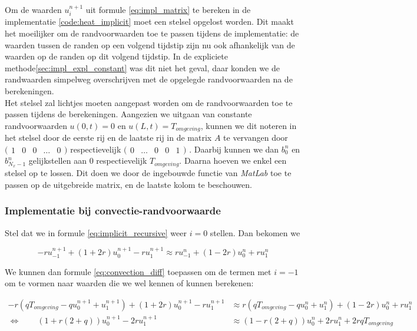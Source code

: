 \documentclass[a4paper,kulak]{kulakarticle} %
\begin{document}
Om de waarden $u_i^{n+1}$ uit formule \ref{eq:impl_matrix} te bereken in de implementatie \ref{code:heat_implicit} moet een stelsel opgelost worden. Dit maakt het moeilijker om de randvoorwaarden toe te passen tijdens de implementatie: de waarden tussen de randen op een volgend tijdstip zijn nu ook afhankelijk van de waarden op de randen op dit volgend tijdstip. In de expliciete methode\ref{sec:impl_expl_constant} was dit niet het geval, daar konden we de randwaarden simpelweg overschrijven met de opgelegde randvoorwaarden na de berekeningen. \\
Het stelsel zal lichtjes moeten aangepast worden om de randvoorwaarden toe te passen tijdens de berekeningen. Aangezien we uitgaan van constante randvoorwaarden $u(0, t) = 0$ en $u(L, t) = T_{omgeving}$, kunnen we dit noteren in het stelsel door de eerste rij en de laatste rij in de matrix $A$ te vervangen door
$\big(\begin{smallmatrix}
	1 & 0 & 0 & \dots & 0
\end{smallmatrix}\big)$ 
respectievelijk
$\big(\begin{smallmatrix}
	0 & \dots & 0 & 0 & 1
\end{smallmatrix}\big)$
. Daarbij kunnen we dan $b_0^n$ en $b_{N_x - 1}^n$ gelijkstellen aan $0$ respectievelijk $T_{omgeving}$. Daarna hoeven we enkel een stelsel op te lossen. Dit doen we door de ingebouwde functie  van \textit{MatLab} toe te passen op de uitgebreide matrix, en de laatste kolom te beschouwen.

\subsubsection{Implementatie bij convectie-randvoorwaarde}

Stel dat we in formule \ref{eq:implicit_recursive} weer $i = 0$ stellen. Dan bekomen we

\begin{equation*}
	- r u_{-1}^{n+1}
	+ \left(1 + 2r\right) u_0^{n+1}
	- r u_1^{n+1}
	\approx
	r u_{-1}^n
	+ \left(1 - 2 r\right) u_0^n
	+ r u_1^n
\end{equation*}

We kunnen dan formule \ref{eq:convection_diff} toepassen om de termen met $i = -1$ om te vormen naar waarden die we wel kennen of kunnen berekenen:

\begin{align*}
	- r \left(q T_{omgeving} - q u_0^{n+1} + u_1^{n+1}\right)
	+ \left(1 + 2r\right) u_0^{n+1}
	- r u_1^{n+1}
	&\approx
	r \left(q T_{omgeving} - q u_0^n + u_1^n\right)
	+ \left(1 - 2 r\right) u_0^n
	+ r u_1^n \\
	\Leftrightarrow \qquad
	\left(1 + r (2 + q)\right) u_0^{n+1}
	- 2 r u_1^{n+1}
	&\approx
	\left(1 - r (2 + q)\right) u_0^n
	+ 2 r u_1^n
	+ 2 r q T_{omgeving}
\end{align*}
\end{document}
